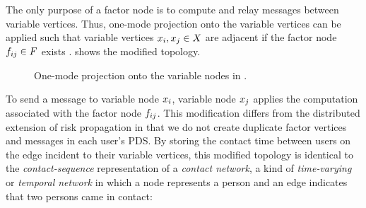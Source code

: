The only purpose of a factor node is to compute and relay messages between variable vertices. Thus, one-mode projection onto the variable vertices can be applied such that variable vertices $\vVariable[i],\vVariable[j] \in \vVariables$ are adjacent if the factor node $\vFactor[ij] \in \vFactors$ exists \citep{Zhou2007}.  shows the modified topology.
%
\begin{figure}[htbp]
\centering
{}
\caption[One-mode projection of a factor graph]{One-mode projection onto the variable nodes in .}
\label{fig:projected}
\end{figure}

To send a message to variable node $\vVariable[i]$, variable node $\vVariable[j]$ applies the computation associated with the factor node $\vFactor[ij]$. This modification differs from the distributed extension of risk propagation \citep{Ayday2021} in that we do not create duplicate factor vertices and messages in each user's PDS. By storing the contact time between users on the edge incident to their variable vertices, this modified topology is identical to the \emph{contact-sequence} representation of a \emph{contact network}, a kind of \emph{time-varying} or \emph{temporal network} in which a node represents a person and an edge indicates that two persons came in contact:

